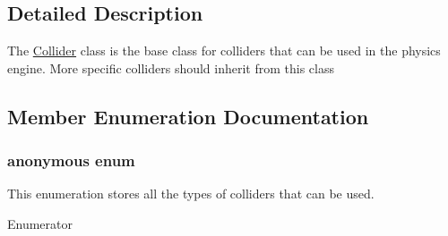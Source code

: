 \subsection{Detailed Description}
The \hyperlink{class_collider}{Collider} class is the base class for colliders that can be used in the physics engine. More specific colliders should inherit from this class 

\subsection{Member Enumeration Documentation}
\hypertarget{class_collider_a63b6ff66c4e92905d981551006239987}{}\subsubsection[{anonymous enum}]{\setlength{\rightskip}{0pt plus 5cm}anonymous enum}\label{class_collider_a63b6ff66c4e92905d981551006239987}
This enumeration stores all the types of colliders that can be used. \begin{Desc}
\item[Enumerator]\par
\begin{description}
\item[{\em 
\hypertarget{class_collider_a63b6ff66c4e92905d981551006239987aedae9a0a3179b58ac15c0616035042e2}{}T\+Y\+P\+E\+\_\+\+S\+P\+H\+E\+R\+E\label{class_collider_a63b6ff66c4e92905d981551006239987aedae9a0a3179b58ac15c0616035042e2}
}]\item[{\em 
\hypertarget{class_collider_a63b6ff66c4e92905d981551006239987a77aeb0be239c46a6adbf47df8eb3123c}{}T\+Y\+P\+E\+\_\+\+A\+A\+B\+B\label{class_collider_a63b6ff66c4e92905d981551006239987a77aeb0be239c46a6adbf47df8eb3123c}
}]\item[{\em 
\hypertarget{class_collider_a63b6ff66c4e92905d981551006239987ae839bd8ef09a93bd5b4bcb8c6cec9251}{}T\+Y\+P\+E\+\_\+\+S\+I\+Z\+E\label{class_collider_a63b6ff66c4e92905d981551006239987ae839bd8ef09a93bd5b4bcb8c6cec9251}
}]\end{description}
\end{Desc}


